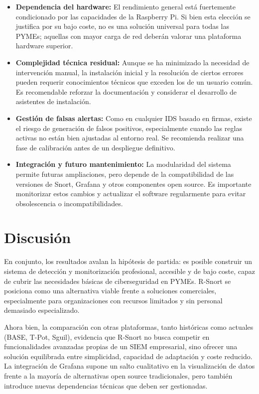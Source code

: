 \documentclass[11pt,a4paper,twoside]{report}
\begin{document}
\begin{itemize}
	\item \textbf{Dependencia del hardware:} El rendimiento general está fuertemente condicionado por las capacidades de la Raspberry Pi. Si bien esta elección se justifica por su bajo coste, no es una solución universal para todas las PYMEs; aquellas con mayor carga de red deberán valorar una plataforma hardware superior.
	\item \textbf{Complejidad técnica residual:} Aunque se ha minimizado la necesidad de intervención manual, la instalación inicial y la resolución de ciertos errores pueden requerir conocimientos técnicos que exceden los de un usuario común. Es recomendable reforzar la documentación y considerar el desarrollo de asistentes de instalación.
	\item \textbf{Gestión de falsas alertas:} Como en cualquier IDS basado en firmas, existe el riesgo de generación de falsos positivos, especialmente cuando las reglas activas no están bien ajustadas al entorno real. Se recomienda realizar una fase de calibración antes de un despliegue definitivo.
	\item \textbf{Integración y futuro mantenimiento:} La modularidad del sistema permite futuras ampliaciones, pero depende de la compatibilidad de las versiones de Snort, Grafana y otros componentes open source. Es importante monitorizar estos cambios y actualizar el software regularmente para evitar obsolescencia o incompatibilidades.
\end{itemize}

\section{Discusión}

En conjunto, los resultados avalan la hipótesis de partida: es posible construir un sistema de detección y monitorización profesional, accesible y de bajo coste, capaz de cubrir las necesidades básicas de ciberseguridad en PYMEs. R-Snort se posiciona como una alternativa viable frente a soluciones comerciales, especialmente para organizaciones con recursos limitados y sin personal demasiado especializado.\newline

Ahora bien, la comparación con otras plataformas, tanto históricas como actuales (BASE, T-Pot, Sguil), evidencia que R-Snort no busca competir en funcionalidades avanzadas propias de un SIEM empresarial, sino ofrecer una solución equilibrada entre simplicidad, capacidad de adaptación y coste reducido. La integración de Grafana supone un salto cualitativo en la visualización de datos frente a la mayoría de alternativas open source tradicionales, pero también introduce nuevas dependencias técnicas que deben ser gestionadas.\newline
\end{document}
